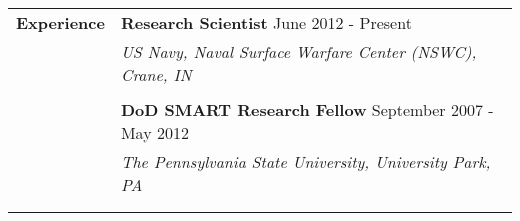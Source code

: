 \begin{tabular}{L{\hlcolw}  L{\rcolw}}
\textbf{\Large Experience} & \textbf{\large Research Scientist} \hfill {\large June 2012 - Present}  \\

& \textit{\large US Navy, Naval Surface Warfare Center (NSWC), Crane, IN} \\ 
&
\vspace{-0.2in} 

\\

& \textbf{\large DoD SMART Research Fellow} \hfill {\large September 2007 - May 2012}  \\
& \textit{\large The Pennsylvania State University, University Park, PA} \\ 
& 
\vspace{-0.2in} 



\\
	\hline \\ 
\end{tabular}